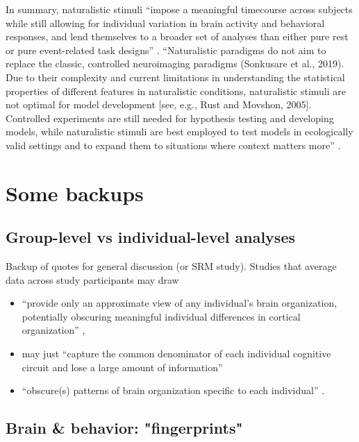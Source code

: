 %
In summary, naturalistic stimuli ``impose a meaningful timecourse across
subjects while still allowing for individual variation in brain activity and
behavioral responses, and lend themselves to a broader set of analyses than
either pure rest or pure event-related task designs'' \citep{finn2017can}.
%
``Naturalistic paradigms do not aim to replace the classic, controlled
neuroimaging paradigms (Sonkusare et al., 2019). Due to their complexity and
current limitations in understanding the statistical properties of different
features in naturalistic conditions, naturalistic stimuli are not optimal for
model development [see, e.g., Rust and Movshon, 2005]. Controlled experiments
are still needed for hypothesis testing and developing models, while
naturalistic stimuli are best employed to test models in ecologically valid
settings and to expand them to situations where context matters
more'' \citep{saarimaki2021naturalistic}.




\section{Some backups}


\subsection{Group-level vs individual-level analyses}

Backup of quotes for general discussion (or SRM study).  Studies that average
data across study participants may draw

\begin{itemize}

\item ``provide only an approximate view of any individual's brain organization,
    potentially obscuring meaningful individual differences in cortical
        organization'' \citep{laumann2015functional},

\item may just ``capture the common denominator of each individual cognitive
    circuit and lose a large amount of information''

\item ``obscure(s) patterns of brain organization specific to each individual''
    \citep{laumann2015functional}.

\end{itemize}


\subsection{Brain \& behavior: "fingerprints"}

